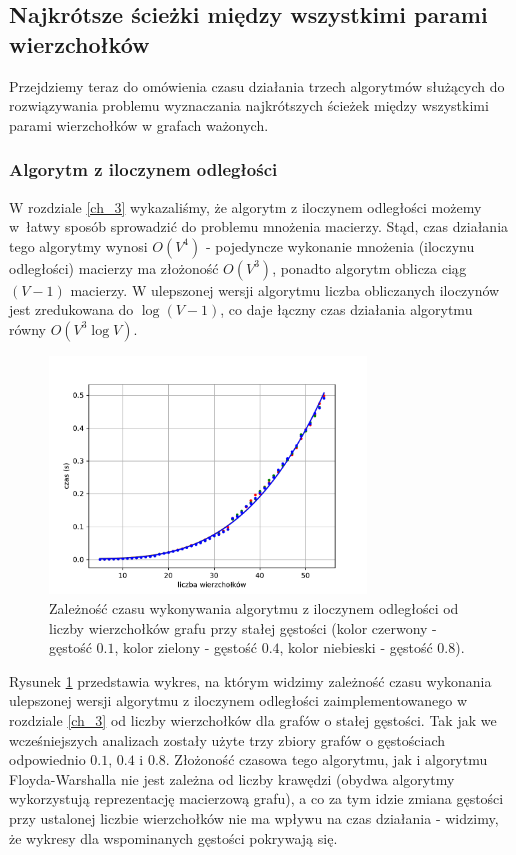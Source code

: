 \documentclass[12pt,a4paper]{book}
\theoremstyle{definition}
\numberwithin{equation}{chapter}
\begin{document}
\subsection{Najkrótsze ścieżki między wszystkimi parami wierzchołków}
Przejdziemy teraz do omówienia czasu działania trzech algorytmów służących do rozwiązywania problemu wyznaczania najkrótszych ścieżek między wszystkimi parami wierzchołków w grafach ważonych.

\subsubsection*{Algorytm z iloczynem odległości}

W rozdziale \ref{ch_3}  wykazaliśmy, że algorytm z iloczynem odległości  możemy w~łatwy sposób sprowadzić do problemu mnożenia macierzy. Stąd, czas działania tego algorytmy wynosi $O(V^4)$ - pojedyncze wykonanie mnożenia (iloczynu odległości) macierzy ma złożoność $O(V^3)$, ponadto algorytm oblicza ciąg $(V-1)$ macierzy. W ulepszonej wersji algorytmu liczba obliczanych iloczynów jest zredukowana do $\log(V-1)$, co daje łączny czas działania algorytmu równy $O(V^3 \log V)$. 

\begin{figure}[H]
\centering
\includegraphics[width=0.75\textwidth]{images/Wykres_Macierze_gestosci.pdf}
\caption{Zależność czasu wykonywania algorytmu z iloczynem odległości od liczby wierzchołków grafu przy stałej gęstości (kolor czerwony - gęstość $0.1$, kolor zielony - gęstość $0.4$, kolor niebieski - gęstość $0.8$).}
\label{rys_wykres_matrix_gestosci}
\end{figure}

Rysunek \ref{rys_wykres_matrix_gestosci} przedstawia wykres, na którym widzimy zależność czasu wykonania ulepszonej wersji algorytmu z iloczynem odległości zaimplementowanego w rozdziale \ref{ch_3} od liczby wierzchołków dla grafów o stałej gęstości. Tak jak we wcześniejszych analizach zostały użyte trzy zbiory grafów o gęstościach odpowiednio $0.1$, $0.4$ i $0.8$. Złożoność czasowa tego algorytmu, jak i algorytmu Floyda-Warshalla nie jest zależna od liczby krawędzi (obydwa algorytmy wykorzystują reprezentację macierzową grafu), a co za tym idzie zmiana gęstości przy ustalonej liczbie wierzchołków nie ma wpływu na czas działania - widzimy, że wykresy dla wspominanych gęstości pokrywają się.
\end{document}
